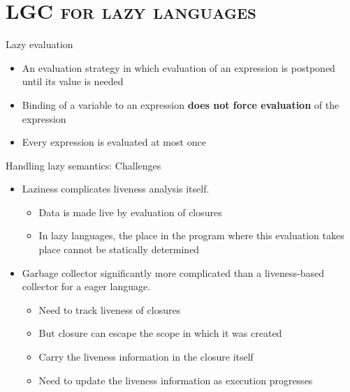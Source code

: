 \documentclass[xcolor=x11names,compress,mathserif]{beamer}
\renewcommand{\(}{\begin{columns}}
\renewcommand{\)}{\end{columns}}
\newcommand{\<}[1]{\begin{column}{#1}}
\renewcommand{\>}{\end{column}}
\begin{document}
\section{\scshape LGC for lazy languages}
\begin{frame} {Lazy evaluation}
\begin{itemize}
\item An evaluation  strategy in which evaluation of  an expression is
  postponed until its value is needed
\item Binding  of a  variable to  an expression  {\bf does  not force
  evaluation} of the expression
\item Every expression is evaluated at most once
\end{itemize}
\end{frame}
\begin{frame}{Handling lazy semantics: Challenges}
\normalsize
  \begin{itemize}\itemsep2em
  \item Laziness complicates liveness analysis itself. 
    \begin{itemize}
    \item Data is made live by evaluation of closures
    \item In lazy languages, the place in the program
      where this evaluation takes place cannot be statically determined
    \end{itemize}
    \pause
  \item Garbage collector significantly more complicated than a liveness-based
    collector for a eager language.
    \begin{itemize}
    \item Need to track liveness of closures
    \item But closure can escape the scope in which it was created
    \item Carry the liveness information in the closure itself
    \item Need to update the liveness information as execution progresses
    \end{itemize}
  \end{itemize}
\end{frame}
\end{document}
